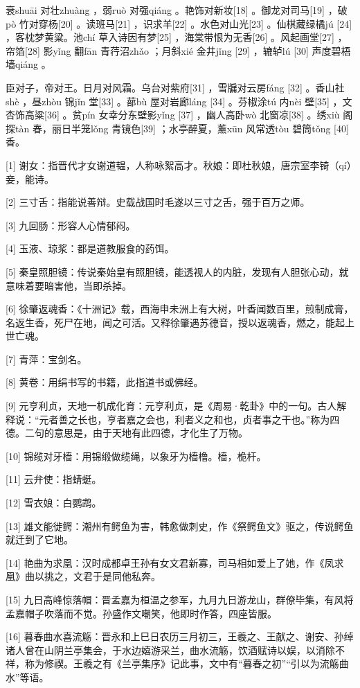 \documentclass[12pt,UTF8]{ctexbook}
\begin{document}
衰shuāi 对壮zhuàng ，弱ruò 对强qiáng 。艳饰对新妆[18] 。御龙对司马[19] ，破pò 竹对穿杨[20] 。读班马[21] ，识求羊[22] 。水色对山光[23] 。仙棋藏绿橘jú [24] ，客枕梦黄粱。池chí 草入诗因有梦[25] ，海棠带恨为无香[26] 。风起画堂[27] ，帘箔[28] 影yǐng 翻fān 青荇沼zhǎo ；月斜xié 金井jǐng [29] ，辘轳lú [30] 声度碧梧墙qiáng 。

臣对子，帝对王。日月对风霜。乌台对紫府[31] ，雪牖对云房fáng [32] 。香山社shè ，昼zhòu 锦jǐn 堂[33] 。蔀bù 屋对岩廊láng [34] 。芬椒涂tú 内nèi 壁[35] ，文杏饰高粱[36] 。贫pín 女幸分东壁影yǐng [37] ，幽人高卧wò 北窗凉[38] 。绣xiù 阁探tàn 春，丽日半笼lǒng 青镜色[39] ；水亭醉夏，薰xūn 风常透tòu 碧筒tǒng [40] 香。


[1] 谢女：指晋代才女谢道韫，人称咏絮高才。秋娘：即杜秋娘，唐宗室李锜（qí）妾，能诗。

[2] 三寸舌：指能说善辩。史载战国时毛遂以三寸之舌，强于百万之师。

[3] 九回肠：形容人心情郁闷。

[4] 玉液、琼浆：都是道教服食的药饵。

[5] 秦皇照胆镜：传说秦始皇有照胆镜，能透视人的内脏，发现有人胆张心动，就意味着要暗害他，当即杀掉。

[6] 徐肇返魂香：《十洲记》载，西海申未洲上有大树，叶香闻数百里，煎制成膏，名返生香，死尸在地，闻之可活。又释徐肇遇苏德音，授以返魂香，燃之，能起上世亡魂。

[7] 青萍：宝剑名。

[8] 黄卷：用绢书写的书籍，此指道书或佛经。

[9] 元亨利贞，天地一机成化育：元亨利贞，是《周易·乾卦》中的一句。古人解释说：“元者善之长也，亨者嘉之会也，利者义之和也，贞者事之干也。”称为四德。二句的意思是，由于天地有此四德，才化生了万物。

[10] 锦缆对牙樯：用锦缎做缆绳，以象牙为樯橹。樯，桅杆。

[11] 云弁使：指蜻蜓。

[12] 雪衣娘：白鹦鹉。

[13] 雄文能徙鳄：潮州有鳄鱼为害，韩愈做刺史，作《祭鳄鱼文》驱之，传说鳄鱼就迁到了它地。

[14] 艳曲为求凰：汉时成都卓王孙有女文君新寡，司马相如爱上了她，作《凤求凰》曲以挑之，文君于是同他私奔。

[15] 九日高峰惊落帽：晋孟嘉为桓温之参军，九月九日游龙山，群僚毕集，有风将孟嘉帽子吹落而不觉。孙盛作文嘲笑，他即时作答，四座皆服。

[16] 暮春曲水喜流觞：晋永和上巳日农历三月初三，王羲之、王献之、谢安、孙绰诸人曾在山阴兰亭集会，于水边嬉游采兰，曲水流觞，饮酒赋诗以娱，以消除不祥，称为修禊。王羲之有《兰亭集序》记此事，文中有“暮春之初”“引以为流觞曲水”等语。
\end{document}
